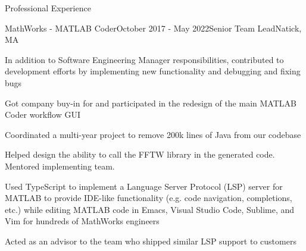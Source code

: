 \documentclass[
	usletter %
	10pt, %
]{resume} %
\begin{document}
\begin{rSection}{Professional Experience}
	\begin{rSubsection}{MathWorks - MATLAB Coder}{October 2017 - May 2022}{Senior Team Lead}{Natick, MA}
		\item In addition to Software Engineering Manager responsibilities, contributed to development efforts by implementing new functionality and debugging and fixing bugs
		\item Got company buy-in for and participated in the redesign of the main MATLAB Coder workflow GUI
		\item Coordinated a multi-year project to remove 200k lines of Java from our codebase
		\item Helped design the ability to call the FFTW library in the generated code. Mentored implementing team.
		\item Used TypeScript to implement a Language Server Protocol (LSP) server for MATLAB to provide IDE-like functionality (e.g. code navigation, completions, etc.) while editing MATLAB code in Emacs, Visual Studio Code, Sublime, and Vim for hundreds of MathWorks engineers
		\item Acted as an advisor to the team who shipped similar LSP support to customers
	\end{rSubsection}



\end{rSection}
\end{document}
